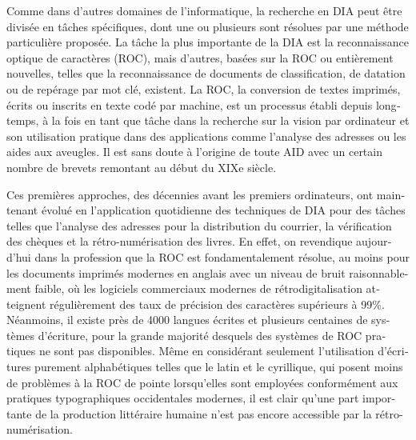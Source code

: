 \begin{french}
Comme dans d'autres domaines de l'informatique, la recherche en DIA peut être
divisée en tâches spécifiques, dont une ou plusieurs sont résolues par
une méthode particulière proposée. La tâche la plus importante de la
DIA est la reconnaissance optique de caractères (ROC), mais d'autres,
basées sur la ROC ou entièrement nouvelles, telles que la
reconnaissance de documents de classification, de datation ou de
repérage par mot clé, existent. La ROC, la conversion de textes imprimés,
écrits ou inscrits en texte codé par machine, est un processus établi depuis
longtemps, à la fois en tant que tâche dans la recherche sur la vision
par ordinateur et son utilisation pratique dans des applications comme
l'analyse des adresses ou les aides aux aveugles. Il est sans doute à
l'origine de toute AID avec un certain nombre de brevets remontant
au début du XIXe siècle.

Ces premières approches, des décennies avant les premiers ordinateurs, ont
maintenant évolué en l'application quotidienne des techniques de DIA
pour des tâches telles que l'analyse des adresses pour la distribution
du courrier, la vérification des chèques et la rétro-numérisation des
livres. En effet, on revendique aujourd'hui dans la profession que la
ROC est fondamentalement résolue, au moins pour les documents imprimés
modernes en anglais avec un niveau de bruit raisonnablement faible, où
les logiciels commerciaux modernes de rétrodigitalisation atteignent
régulièrement des taux de précision des caractères supérieurs à 99\%.
Néanmoins, il existe près de 4000 langues écrites et plusieurs centaines de
systèmes d'écriture, pour la grande majorité desquels des systèmes de
ROC pratiques ne sont pas disponibles. Même en considérant seulement
l'utilisation d'écritures purement alphabétiques telles que le latin et
le cyrillique, qui posent moins de problèmes à la ROC de pointe
lorsqu'elles sont employées conformément aux pratiques typographiques
occidentales modernes, il est clair qu'une part importante de la
production littéraire humaine n'est pas encore accessible par la
rétro-numérisation.


\end{french}
